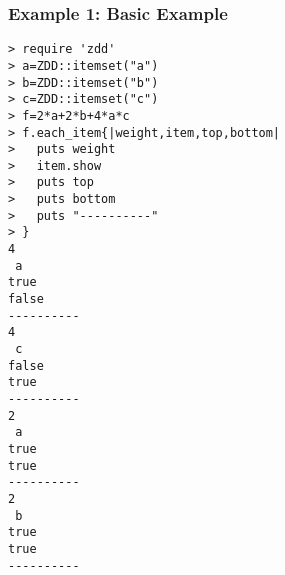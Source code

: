 \subsubsection*{Example 1: Basic Example}



\begin{Verbatim}[baselinestretch=0.7,frame=single]
> require 'zdd'
> a=ZDD::itemset("a")
> b=ZDD::itemset("b")
> c=ZDD::itemset("c")
> f=2*a+2*b+4*a*c
> f.each_item{|weight,item,top,bottom|
>   puts weight
>   item.show
>   puts top
>   puts bottom
>   puts "----------"
> }
4
 a
true
false
----------
4
 c
false
true
----------
2
 a
true
true
----------
2
 b
true
true
----------
\end{Verbatim}
